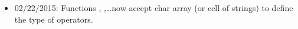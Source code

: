 \begin{itemize}
\item 02/22/2015: Functions \IntegralOperator, \BlockIntegralOperator,\ldots now accept char array (or cell of strings) to define the type of operators.
\end{itemize}